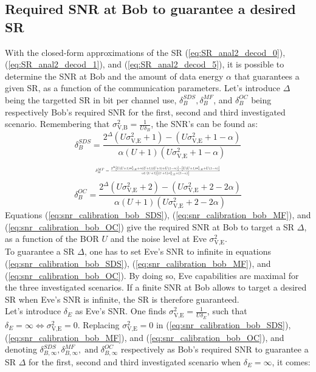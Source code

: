 \documentclass[journal,comsoc]{IEEEtran}
\begin{document}
\subsection{Required SNR at Bob to guarantee a desired SR}
 \label{sec:required-snr-at-bob-for-a-targetted-sr}
With the closed-form approximations of the SR (\ref{eq:SR_anal2_decod_0}), (\ref{eq:SR_anal2_decod_1}), and (\ref{eq:SR_anal2_decod_5}), it is possible to determine the SNR at Bob and the amount of data energy $\alpha$ that guarantees a given SR, as a function of the communication parameters. Let's introduce $\Delta$ being the targetted SR in bit per channel use, $\delta_B^{SDS}, \delta_B^{MF}$, and $\delta_B^{OC}$ being respectively Bob's required SNR for the first, second and third investigated scenario. Remembering that $\sigma^2_{\text{V,B}} = \frac{1}{U\delta_{B}}$, the SNR's can be found as:
\begin{equation}
\delta_{B}^{SDS} = \frac{2^\Delta (U\sigma_{\text{V,E}}^2+1) - (U\sigma_{\text{V,E}}^2+1-\alpha) }{\alpha(U+1)(U\sigma_{\text{V,E}}^2+1-\alpha)}
\label{eq:snr_calibration_bob_SDS}
\end{equation}
\begin{equation}
\resizebox{.435 \textwidth}{!} 
{
	$\delta_{B}^{MF} = \frac{2^\Delta \left[U(U+1)\sigma_{\text{V,E}}^2 + \alpha(U+1)(U+3)+U(1-\alpha) \right] - \left[ U(U+1)\sigma_{\text{V,E}}^2+U(1-\alpha)\right] }{\alpha U(U+1)\left[(U+1)\sigma_{\text{V,E}}^2+(1-\alpha)\right]}$
}
	\label{eq:snr_calibration_bob_MF}
\end{equation}
\begin{equation}
\delta_{B}^{OC} = \frac{2^\Delta  (U\sigma_{\text{V,E}}^2+2) - (U\sigma_{\text{V,E}}^2+2-2\alpha) }{ \alpha(U+1)(U\sigma_{\text{V,E}}^2+2-2\alpha)}
\label{eq:snr_calibration_bob_OC}
\end{equation}
Equations (\ref{eq:snr_calibration_bob_SDS}), (\ref{eq:snr_calibration_bob_MF}), and (\ref{eq:snr_calibration_bob_OC})  give the required SNR at Bob to target a SR $\Delta$, as a function of the BOR $U$ and the noise level at Eve $\sigma_{\text{V,E}}^2$. \\
To guarantee a SR $\Delta$, one has to set Eve's SNR to infinite in equations (\ref{eq:snr_calibration_bob_SDS}), (\ref{eq:snr_calibration_bob_MF}), and (\ref{eq:snr_calibration_bob_OC}). By doing so, Eve capabilities are maximal for the three investigated scenarios. If a finite SNR at Bob allows to target a desired SR when Eve's SNR is infinite, the SR is therefore guaranteed. \\
Let's introduce $\delta_E$ as Eve's SNR. One finds $\sigma^2_{\text{V,E}} = \frac{1}{U\delta_{E}}$, such that $\delta_{E} = \infty \Leftrightarrow \sigma_{\text{V,E}}^2 = 0$. Replacing $ \sigma_{\text{V,E}}^2 = 0$ in (\ref{eq:snr_calibration_bob_SDS}), (\ref{eq:snr_calibration_bob_MF}), and (\ref{eq:snr_calibration_bob_OC}), and denoting $\delta_{B,\infty}^{SDS}, \delta_{B,\infty}^{MF}, \; \text{and}\;  \delta_{B,\infty}^{OC}$ respectively as Bob's required SNR to guarantee a SR $\Delta$ for the first, second and third investigated scenario when $\delta_E = \infty$, it comes:
\end{document}

